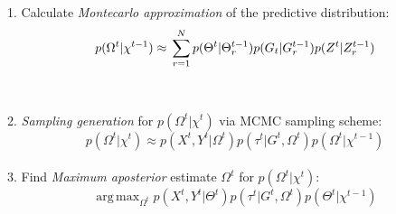 {1. Calculate \textit{Montecarlo approximation} of the predictive distribution:\\
$$
 p(\Omega^{t} |\chi^{t-1}) \approx \\ \nonumber
\sum_{r=1}^{N} p(\Theta^{t} | \Theta^{t-1}_r) p(G_t |G^{t-1}_r) p(Z^t |Z^{t-1}_r) 
$$
\\
\\
2. \textit{Sampling generation} for $p(\Omega^{t} |\chi^{t})$ via MCMC sampling scheme:\\
$$
p(\Omega^{t} |\chi^{t}) \approx  p(X^{t}, Y^t |\Omega^{t}) p(\tau^{t} | G^t ,\Omega^{t}) 
p(\Omega^{t} |\chi^{t-1})
$$
\\
3. Find \textit{Maximum aposterior} estimate $\Omega^{t}$ for $p(\Omega^{t} |\chi^{t})$:\\
\[
 \operatorname{arg\,max}_{\Omega^{t}} p(X^{t}, Y^t |\Theta^{t}) p(\tau^{t} | G^t ,\Omega^{t}) p(\Theta^{t} |\chi^{t-1}) 
\]
}\\[.4cm]
\\
\\

